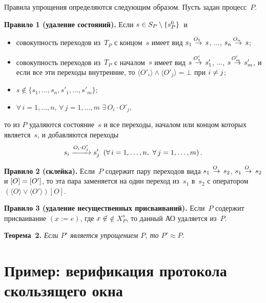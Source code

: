 \begin{multicols}{2}
Правила упрощения определяются следующим образом.
Пусть задан процесс~$P$.

\smallskip

\noindent
\textbf{Правило 1 (удаление состояний).}
Если $s\hm\in S_P\setminus \{s^0_P\}$~и
\begin{itemize}
\item совокупность переходов из~$T_P$
     с концом~$s$ имеет вид
$s_1\;\mathop{\to}\limits^{\!\!\!O_1}\;s$, $\ldots$, $s_n\;\mathop{\to}\limits^{\!\!\!O_n}\;s$;

\item  совокупность переходов из~$T_P$
     с началом~$s$ имеет вид $s\;\mathop{\to}\limits^{\!\!\!O'_1}\;s'_1$, $\ldots$, $s\;\mathop{\to}\limits^{\!\!\!O'_m}\;s'_m$,
и если все эти переходы внутренние, то $\langle{O'_i}\rangle\wedge \langle{O'_j}\rangle=\bot$
при $i\hm\neq j$;

  \item $s\not\in\{s_1,\ldots,      s_n,s'_1,\ldots,s'_m\}$;

  \item  $\forall\,i=1,\ldots, n$, $\forall\,j=1,\ldots, m$
$\exists\,O_i \cdot O'_j$,
\end{itemize}
то из $P$ удаляются состояние~$s$ и все переходы, началом или концом которых
является~$s$, и добавляются переходы
\begin{equation*}
 s_i  \xrightarrow{O_i\cdot O'_j} s'_j\enskip
         (\forall\,i=1,\ldots, n,\
         \forall\,j=1,\ldots, m)\,.
         \end{equation*}

         \noindent
         \textbf{Правило 2 (склейка).}
  Если~$P$ содержит
  пару переходов вида $s_1\;\mathop{\to}\limits^{\!\!\!O}\;s_2$,   $s_1\;\mathop{\to}\limits^{\!\!\!O}\;s_2$
и $[O]\hm=[O']$,    то эта пара заменяется на один переход
из~$s_1$ в~$s_2$  с оператором $(\langle{O}\rangle\vee \langle{O'}\rangle)[O]$.

\smallskip

\noindent
\textbf{Правило 3 (удаление несущественных присваиваний).}
Если~$P$ содержит   присваивание $(x:=e)$, где $x\hm\not\in$\linebreak $\not\in X^s_P$,
  то данный АО удаляется из~$P$.

  \smallskip


\noindent
\textbf{Теорема~2.}
\textit{Если $P'$ является упрощением $P$,
то $P'\approx P$}.

\section{Пример: верификация протокола скользящего окна}


\end{multicols}
